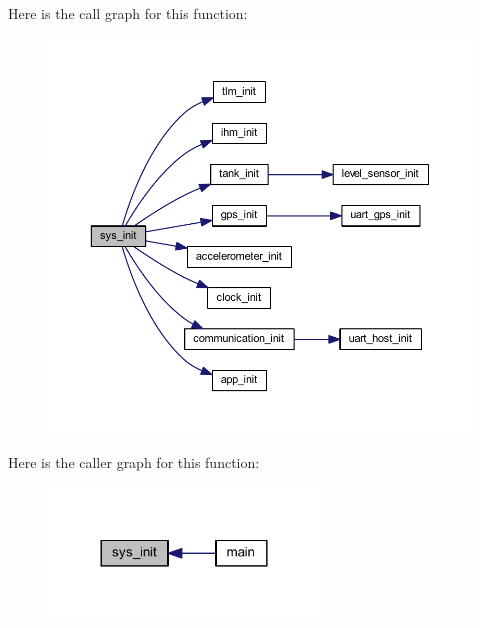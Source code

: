 Here is the call graph for this function\+:
\nopagebreak
\begin{figure}[H]
\begin{center}
\leavevmode
\includegraphics[width=350pt]{group__main__module_gaf411a8bc6b7ed4b0af9114e10c959448_cgraph}
\end{center}
\end{figure}
Here is the caller graph for this function\+:
\nopagebreak
\begin{figure}[H]
\begin{center}
\leavevmode
\includegraphics[width=204pt]{group__main__module_gaf411a8bc6b7ed4b0af9114e10c959448_icgraph}
\end{center}
\end{figure}
